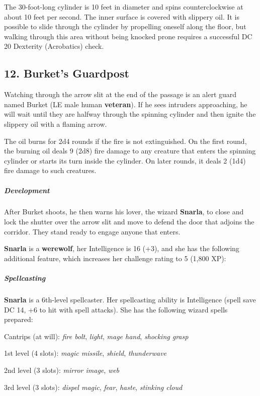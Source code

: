 \documentclass[10pt,a4paper,twoside,bg=print,twocolumn,openany,nodeprecatedcode]{dndbook}
\begin{document}
The 30-foot-long cylinder is 10 feet in diameter and spins counterclockwise at about 10 feet per second. The inner surface is covered with slippery oil. It is possible to slide through the cylinder by propelling oneself along the floor, but walking through this area without being knocked prone requires a successful DC 20 Dexterity (Acrobatics) check.

\subsection{12. Burket's Guardpost}
Watching through the arrow slit at the end of the passage is an alert guard named Burket (LE male human \textbf{veteran}). If he sees intruders approaching, he will wait until they are halfway through the spinning cylinder and then ignite the slippery oil with a flaming arrow.

The oil burns for 2d4 rounds if the fire is not extinguished. On the first round, the burning oil deals 9 (2d8) fire damage to any creature that enters the spinning cylinder or starts its turn inside the cylinder. On later rounds, it deals 2 (1d4) fire damage to such creatures.

\subparagraph{Development}
After Burket shoots, he then warns his lover, the wizard \textbf{Snarla}, to close and lock the shutter over the arrow slit and move to defend the door that adjoins the corridor. They stand ready to engage anyone that enters.

\textbf{Snarla} is a \textbf{werewolf}, her Intelligence is 16 (+3), and she has the following additional feature, which increases her challenge rating to 5 (1,800 XP):

\begin{DndSidebar}[float=!b]{}
\subparagraph{Spellcasting}
\textbf{Snarla} is a 6th-level spellcaster. Her spellcasting ability is Intelligence (spell save DC 14, +6 to hit with spell attacks). She has the following wizard spells prepared:

Cantrips (at will): \textit{fire bolt}, \textit{light}, \textit{mage hand}, \textit{shocking grasp}

1st level (4 slots): \textit{magic missile}, \textit{shield}, \textit{thunderwave}

2nd level (3 slots): \textit{mirror image}, \textit{web}

3rd level (3 slots): \textit{dispel magic}, \textit{fear}, \textit{haste}, \textit{stinking cloud}



\end{DndSidebar}
\end{document}
